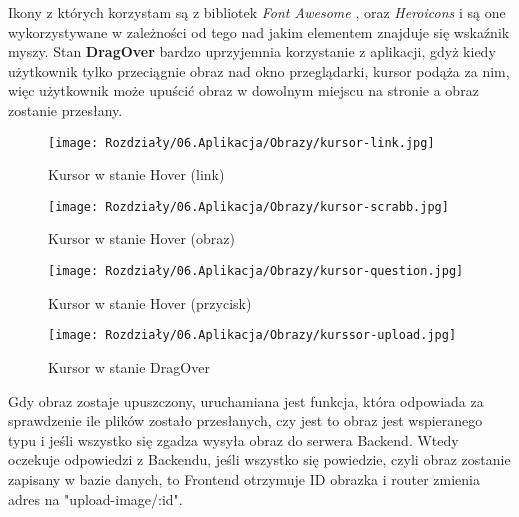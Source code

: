 Ikony z których korzystam są z bibliotek \textit{Font Awesome} \cite{fonta}, oraz \textit{Heroicons} \cite{heroicons} i są one wykorzystywane w zależności od tego nad jakim elementem znajduje się wskaźnik myszy.
Stan \textbf{DragOver} bardzo uprzyjemnia korzystanie z aplikacji, gdyż kiedy użytkownik tylko przeciągnie obraz nad okno przeglądarki, kursor podąża za nim, więc użytkownik może upuścić obraz w dowolnym miejscu na stronie a obraz zostanie przesłany.

\begin{figure}[ht]
    \centering
    \begin{minipage}[t]{0.47\linewidth}
        \texttt{[image: Rozdziały/06.Aplikacja/Obrazy/kursor-link.jpg]}
        \caption{Kursor w stanie Hover (link)}
        \label{fig:image89}
    \end{minipage}
    \hspace{0.5cm}
    \begin{minipage}[t]{0.47\linewidth}
        \texttt{[image: Rozdziały/06.Aplikacja/Obrazy/kursor-scrabb.jpg]}
        \caption{Kursor w stanie Hover (obraz)}
        \label{fig:image90}
    \end{minipage}
\end{figure}

\begin{figure}[ht]
    \centering
    \begin{minipage}[t]{0.47\linewidth}
        \texttt{[image: Rozdziały/06.Aplikacja/Obrazy/kursor-question.jpg]}
        \caption{Kursor w stanie Hover (przycisk)}
        \label{fig:image91}
    \end{minipage}
    \hspace{0.5cm}
    \begin{minipage}[t]{0.47\linewidth}
        \texttt{[image: Rozdziały/06.Aplikacja/Obrazy/kurssor-upload.jpg]}
        \caption{Kursor w stanie DragOver}
        \label{fig:image92}
    \end{minipage}
\end{figure}


Gdy obraz zostaje upuszczony, uruchamiana jest funkcja, która odpowiada za sprawdzenie ile plików zostało przesłanych, czy jest to obraz jest wspieranego typu i jeśli wszystko się zgadza wysyła obraz do serwera Backend. Wtedy oczekuje odpowiedzi z Backendu, jeśli wszystko się powiedzie, czyli obraz zostanie zapisany w bazie danych, to Frontend otrzymuje ID obrazka i router zmienia adres na "upload-image/:id". 



